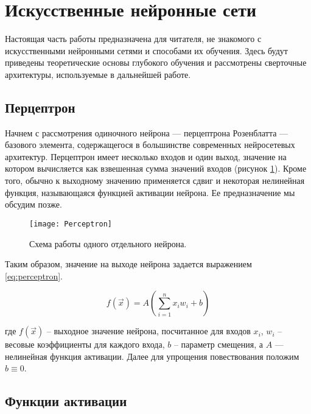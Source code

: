 \section{Искусственные нейронные сети}

\indent
\indent
Настоящая часть работы предназначена для читателя, не знакомого с 
искусственными нейронными сетями и способами их обучения. 
Здесь будут приведены теоретические 
основы глубокого обучения и рассмотрены сверточные архитектуры, 
используемые в дальнейшей работе.


\subsection{Перцептрон}

\indent
Начнем с рассмотрения одиночного нейрона
 --- перцептрона Розенблатта --- базового элемента, содержащегося в большинстве современных нейросетевых архитектур.
Перцептрон имеет несколько входов и один выход, значение на котором
вычисляется как взвешенная сумма значений входов 
(рисунок \ref{tikzpicture: perceptron}).
Кроме того, обычно
к выходному значению применяется сдвиг и некоторая нелинейная функция, 
называющаяся функцией активации нейрона. Ее предназначение мы обсудим позже.

\begin{figure}[h!]
    \begin{center}
   	    \texttt{[image: Perceptron]}
   	\end{center}
   	\caption{Схема работы одного отдельного нейрона.}
   	\label{tikzpicture: perceptron}
\end{figure}


\indent
\indent
Таким образом, значение на выходе нейрона задается
 выражением \ref{eq:perceptron}.

\begin{equation}\label{eq:perceptron}
    f(\vec{x}) = A(\sum_{i=1}^n x_i w_i + b)
\end{equation}


где $f(\vec{x})$ -- выходное значение нейрона, посчитанное для входов $x_i$,
$w_i$ -- весовые коэффициенты для каждого входа, $b$ -- параметр смещения, 
а $A$ --- нелинейная функция активации. Далее для упрощения повествования
положим $b \equiv 0$.

\subsection{Функции активации}


